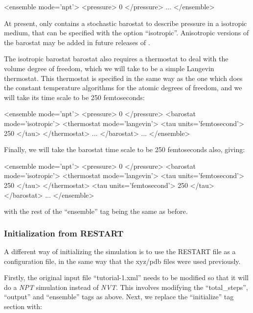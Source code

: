 \documentclass[11pt,english,fleqn]{report}
\newenvironment{code}{%
\footnotesize 
\verbatim
}{
\endverbatim
\normalsize
}
\begin{document}
\begin{code}
<ensemble mode='npt'>
   <pressure> 0 </pressure>
   ...
</ensemble>
\end{code}

At present, \ipi only contains a stochastic barostat to describe pressure in 
a isotropic medium, that can be specified with the option ``isotropic''. 
Anisotropic versions of the barostat may be added in future releases of \ipi. 

The isotropic barostat barostat also requires a 
thermostat to deal with the volume degree of freedom, which we will take
to be a simple Langevin thermostat.
This thermostat is specified in the same way as the one which does the
constant temperature algorithms for the atomic degrees of freedom, and
we will take its time scale to be 250 femtoseconds:

\begin{code}
<ensemble mode='npt'>
   <pressure> 0 </pressure>
   <barostat mode='isotropic'>
      <thermostat mode='langevin'>
         <tau units='femtosecond'> 250 </tau>
      </thermostat>
      ...
   </barostat>
   ...
</ensemble>
\end{code}

Finally, we will take the barostat time scale to be 250 femtoseconds also, giving:

\begin{code}
<ensemble mode='npt'>
   <pressure> 0 </pressure>
   <barostat mode='isotropic'>
      <thermostat mode='langevin'>
         <tau units='femtosecond'> 250 </tau>
      </thermostat>
      <tau units='femtosecond'> 250 </tau>
   </barostat>
   ...
</ensemble>
\end{code}
with the rest of the {}``ensemble'' tag being the same as before.

\subsubsection{Initialization from RESTART}

A different way of initializing the simulation is to use the 
RESTART file as a configuration file, in the same way that
the xyz/pdb files were used previously.

Firstly, the original input file {}``tutorial-1.xml'' needs to
be modified so that
it will do a \emph{NPT} simulation instead of \emph{NVT}. This involves modifying
the {}``total\_steps'', {}``output'' and {}``ensemble'' tags as
above. Next, we replace the {}``initialize'' tag section with:
\end{document}
